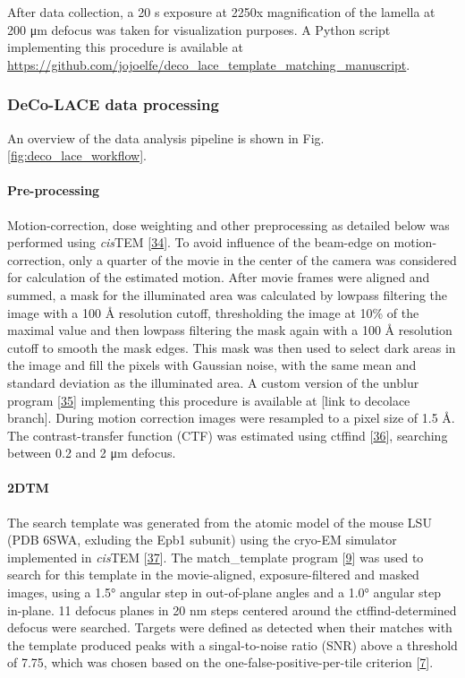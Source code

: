 \documentclass[
]{article}
\begin{document}
After data collection, a 20 s exposure at 2250x magnification of the
lamella at 200 μm defocus was taken for visualization purposes. A Python
script implementing this procedure is available at
\url{https://github.com/jojoelfe/deco_lace_template_matching_manuscript}.

\hypertarget{deco-lace-data-processing}{%
\subsubsection{DeCo-LACE data processing}\label{deco-lace-data-processing}}

An overview of the data analysis pipeline is shown in Fig.
\ref{fig:deco_lace_workflow}.

\hypertarget{pre-processing}{%
\paragraph{Pre-processing}\label{pre-processing}}

Motion-correction, dose weighting and other preprocessing as detailed
below was performed using \emph{cis}TEM {[}\protect\hyperlink{ref-MUY42yxp}{34}{]}. To avoid
influence of the beam-edge on motion-correction, only a quarter of the
movie in the center of the camera was considered for calculation of the
estimated motion. After movie frames were aligned and summed, a mask for
the illuminated area was calculated by lowpass filtering the image with
a 100 Å resolution cutoff, thresholding the image at 10\% of the maximal
value and then lowpass filtering the mask again with a 100 Å resolution
cutoff to smooth the mask edges. This mask was then used to select dark
areas in the image and fill the pixels with Gaussian noise, with the
same mean and standard deviation as the illuminated area. A custom
version of the unblur program {[}\protect\hyperlink{ref-1G4Y94qCy}{35}{]} implementing
this procedure is available at {[}link to decolace branch{]}. During
motion correction images were resampled to a pixel size of 1.5 Å. The
contrast-transfer function (CTF) was estimated using ctffind
{[}\protect\hyperlink{ref-n43f3Sqs}{36}{]}, searching between 0.2 and 2 μm
defocus.

\hypertarget{dtm}{%
\paragraph{2DTM}\label{dtm}}

The search template was generated from the atomic model of the mouse LSU
(PDB 6SWA, exluding the Epb1 subunit) using the cryo-EM simulator
implemented in \emph{cis}TEM {[}\protect\hyperlink{ref-q2PSamkS}{37}{]}. The
match\_template program {[}\protect\hyperlink{ref-10bXZuF3G}{9}{]} was used to search for
this template in the movie-aligned, exposure-filtered and masked images,
using a 1.5° angular step in out-of-plane angles and a 1.0° angular step
in-plane. 11 defocus planes in 20 nm steps centered around the
ctffind-determined defocus were searched. Targets were defined as
detected when their matches with the template produced peaks with a
singal-to-noise ratio (SNR) above a threshold of 7.75, which was chosen
based on the one-false-positive-per-tile criterion
{[}\protect\hyperlink{ref-Ynb3IP6I}{7}{]}.
\end{document}
